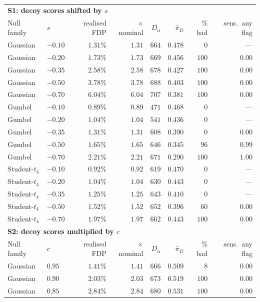 \begin{tabular}{llrrrrrr}
\toprule
\multicolumn{8}{l}{\textbf{S1: decoy scores shifted by $s$}} \\
Null family & $s$ & realised FDP & $\times$ nominal & $\overline{D_\alpha}$ & $\widehat\pi_D$ & \% bad & sens.\ any flag \\
\midrule
Gaussian & $-0.10$ & $1.31\%$ & $1.31$ & $664$ & $0.478$ & $0$ & --- \\
Gaussian & $-0.20$ & $1.73\%$ & $1.73$ & $669$ & $0.456$ & $100$ & 0.00 \\
Gaussian & $-0.35$ & $2.58\%$ & $2.58$ & $678$ & $0.427$ & $100$ & 0.00 \\
Gaussian & $-0.50$ & $3.78\%$ & $3.78$ & $688$ & $0.403$ & $100$ & 0.00 \\
Gaussian & $-0.70$ & $6.04\%$ & $6.04$ & $707$ & $0.381$ & $100$ & 0.00 \\
Gumbel & $-0.10$ & $0.89\%$ & $0.89$ & $471$ & $0.468$ & $0$ & --- \\
Gumbel & $-0.20$ & $1.04\%$ & $1.04$ & $541$ & $0.436$ & $0$ & --- \\
Gumbel & $-0.35$ & $1.31\%$ & $1.31$ & $608$ & $0.390$ & $0$ & 0.00 \\
Gumbel & $-0.50$ & $1.65\%$ & $1.65$ & $646$ & $0.345$ & $96$ & 0.99 \\
Gumbel & $-0.70$ & $2.21\%$ & $2.21$ & $671$ & $0.290$ & $100$ & 1.00 \\
Student-$t_4$ & $-0.10$ & $0.92\%$ & $0.92$ & $619$ & $0.470$ & $0$ & --- \\
Student-$t_4$ & $-0.20$ & $1.04\%$ & $1.04$ & $630$ & $0.443$ & $0$ & --- \\
Student-$t_4$ & $-0.35$ & $1.25\%$ & $1.25$ & $643$ & $0.410$ & $0$ & --- \\
Student-$t_4$ & $-0.50$ & $1.52\%$ & $1.52$ & $652$ & $0.396$ & $60$ & 0.00 \\
Student-$t_4$ & $-0.70$ & $1.97\%$ & $1.97$ & $662$ & $0.443$ & $100$ & 0.00 \\
\midrule
\multicolumn{8}{l}{\textbf{S2: decoy scores multiplied by $c$}} \\
Null family & $c$ & realised FDP & $\times$ nominal & $\overline{D_\alpha}$ & $\widehat\pi_D$ & \% bad & sens.\ any flag \\
\midrule
Gaussian & $0.95$ & $1.41\%$ & $1.41$ & $666$ & $0.509$ & $8$ & 0.00 \\
Gaussian & $0.90$ & $2.03\%$ & $2.03$ & $673$ & $0.519$ & $100$ & 0.00 \\
Gaussian & $0.85$ & $2.84\%$ & $2.84$ & $680$ & $0.531$ & $100$ & 0.00 \\

\end{tabular}
